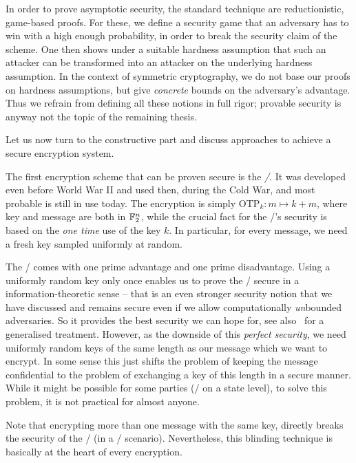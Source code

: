 In order to prove asymptotic security, the standard technique are reductionistic, game-based proofs.
For these, we define a security game that an adversary has to win with a high enough probability, in order to break the security claim of the scheme.
One then shows under a suitable hardness assumption that such an attacker can be transformed into an attacker on the underlying hardness assumption.
In the context of symmetric cryptography, we do not base our proofs on hardness assumptions, but give \emph{concrete} bounds on the adversary's advantage.
Thus we refrain from defining all these notions in full rigor; provable security is anyway not the topic of the remaining thesis.

Let us now turn to the constructive part and discuss approaches to achieve a secure encryption system.

The first encryption scheme that can be proven secure is the \emph{\OTP/}.
It was developed even before World War II and used then, during the Cold War, and most probable is still in use today.
The encryption is simply $\mathrm{OTP}_k : m \mapsto k + m$, where key and message are both in $\mathbb{F}_2^n$, while the crucial fact for the \OTP/'s security is based on the \emph{one time} use of the key $k$.
In particular, for every message, we need a fresh key sampled uniformly at random.

The \OTP/ comes with one prime advantage and one prime disadvantage.
Using a uniformly random key only once enables us to prove the \OTP/ secure in a information-theoretic sense -- that is an even stronger security notion that we have discussed and remains secure even if we allow computationally \emph{un}bounded adversaries.
So it provides the best security we can hope for, see also~\cite[Section~10]{Shannon49} for a generalised treatment.
However, as the downside of this \emph{perfect security}, we need uniformly random keys of the same length as our message which we want to encrypt.
In some sense this just shifts the problem of keeping the message confidential to the problem of exchanging a key of this length in a secure manner.
While it might be possible for some parties (\ie/ on a state level), to solve this problem, it is not practical for almost anyone.

Note that encrypting more than one message with the same key, directly breaks the security of the \OTP/ (in a \KPA/ scenario).
Nevertheless, this blinding technique is basically at the heart of every encryption.

